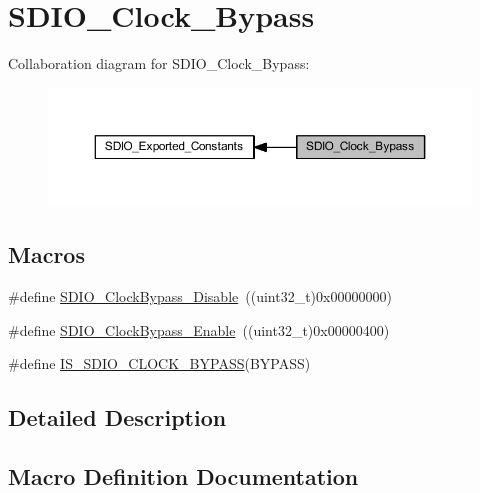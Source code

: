 \hypertarget{group___s_d_i_o___clock___bypass}{}\section{S\+D\+I\+O\+\_\+\+Clock\+\_\+\+Bypass}
\label{group___s_d_i_o___clock___bypass}
Collaboration diagram for S\+D\+I\+O\+\_\+\+Clock\+\_\+\+Bypass\+:
\nopagebreak
\begin{figure}[H]
\begin{center}
\leavevmode
\includegraphics[width=350pt]{group___s_d_i_o___clock___bypass}
\end{center}
\end{figure}
\subsection*{Macros}
\begin{DoxyCompactItemize}
\item 
\#define \hyperlink{group___s_d_i_o___clock___bypass_gacc168d55136a0c6575e5afd7a6550343}{S\+D\+I\+O\+\_\+\+Clock\+Bypass\+\_\+\+Disable}~((uint32\+\_\+t)0x00000000)
\item 
\#define \hyperlink{group___s_d_i_o___clock___bypass_ga5e1e9f7e05ea62dd2315eb556bc10e5c}{S\+D\+I\+O\+\_\+\+Clock\+Bypass\+\_\+\+Enable}~((uint32\+\_\+t)0x00000400)
\item 
\#define \hyperlink{group___s_d_i_o___clock___bypass_ga5d5a2fcdd3150e4a89c5aa1efd738dec}{I\+S\+\_\+\+S\+D\+I\+O\+\_\+\+C\+L\+O\+C\+K\+\_\+\+B\+Y\+P\+A\+SS}(B\+Y\+P\+A\+SS)
\end{DoxyCompactItemize}


\subsection{Detailed Description}


\subsection{Macro Definition Documentation}
\mbox{\label{group___s_d_i_o___clock___bypass_ga5d5a2fcdd3150e4a89c5aa1efd738dec}} 
